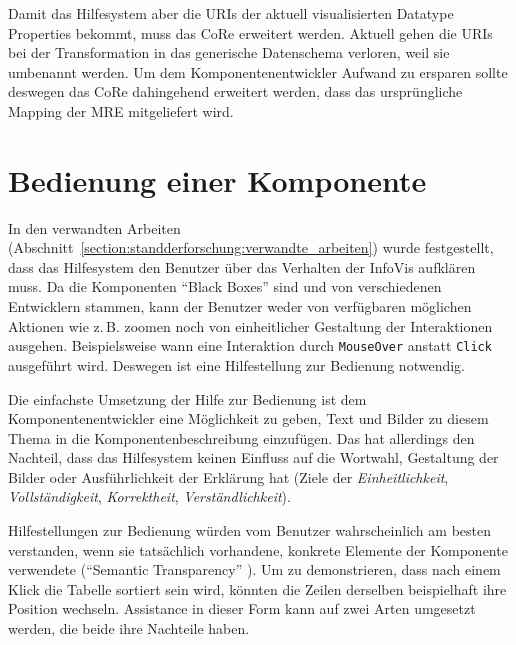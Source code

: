 \documentclass[
	headsepline,
	footsepline,
	fontsize=12pt,
	bibliography=totoc
]{scrbook}
\begin{document}

Damit das Hilfesystem aber die URIs der aktuell visualisierten Datatype Properties bekommt, muss das CoRe erweitert werden. Aktuell gehen die URIs bei der Transformation in das generische Datenschema verloren, weil sie umbenannt werden. Um dem Komponentenentwickler Aufwand zu ersparen sollte deswegen das CoRe dahingehend erweitert werden, dass das ursprüngliche Mapping der MRE mitgeliefert wird.


\section{Bedienung einer Komponente}
\label{section:konzeption:bedienung}

In den verwandten Arbeiten (Abschnitt~\ref{section:standderforschung:verwandte_arbeiten}) wurde festgestellt, dass das Hilfesystem den Benutzer über das Verhalten der InfoVis aufklären muss. Da die Komponenten \enquote{Black Boxes} sind und von verschiedenen Entwicklern stammen, kann der Benutzer weder von verfügbaren möglichen Aktionen wie z.\,B. zoomen noch von einheitlicher Gestaltung der Interaktionen ausgehen. Beispielsweise wann eine Interaktion durch \texttt{MouseOver} anstatt \texttt{Click} ausgeführt wird. Deswegen ist eine Hilfestellung zur Bedienung notwendig.


Die einfachste Umsetzung der Hilfe zur Bedienung ist dem Komponentenentwickler eine Möglichkeit zu geben, Text und Bilder zu diesem Thema in die Komponentenbeschreibung einzufügen. Das hat allerdings den Nachteil, dass das Hilfesystem keinen Einfluss auf die Wortwahl, Gestaltung der Bilder oder Ausführlichkeit der Erklärung hat (Ziele der \emph{Einheitlichkeit}, \emph{Vollständigkeit}, \emph{Korrektheit}, \emph{Verständlichkeit}).

Hilfestellungen zur Bedienung würden vom Benutzer wahrscheinlich am besten verstanden, wenn sie tatsächlich vorhandene, konkrete Elemente der Komponente verwendete (\enquote{Semantic Transparency} \cite{Kohlhase2009}). Um zu demonstrieren, dass nach einem Klick die Tabelle sortiert sein wird, könnten die Zeilen derselben beispielhaft ihre Position wechseln. Assistance in dieser Form kann auf zwei Arten umgesetzt werden, die beide ihre Nachteile haben.
\end{document}
